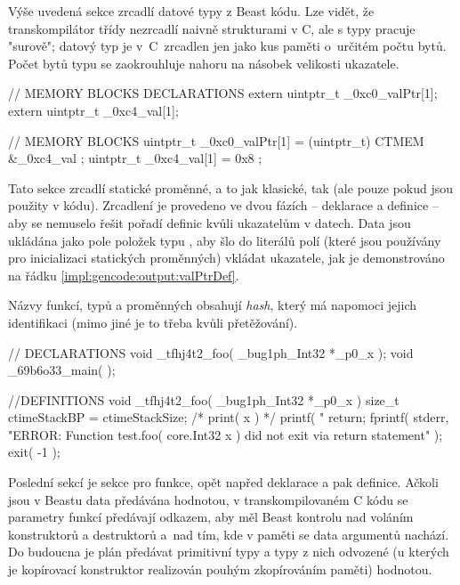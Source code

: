 Výše uvedená sekce zrcadlí datové typy z Beast kódu. Lze vidět, že transkompilátor třídy nezrcadlí naivně strukturami v C, ale s typy pracuje "surově"; datový typ je v~C~zrcadlen jen jako kus paměti o~určitém počtu bytů. Počet bytů typu se zaokrouhluje nahoru na násobek velikosti ukazatele.

\begin{cppcode}
// MEMORY BLOCKS DECLARATIONS
extern uintptr_t _0xc0_valPtr[1];
extern uintptr_t _0xc4_val[1];

// MEMORY BLOCKS
uintptr_t _0xc0_valPtr[1] = { (uintptr_t) CTMEM &_0xc4_val };$\label{impl:gencode:output:valPtrDef}$
uintptr_t _0xc4_val[1] = { 0x8 };
\end{cppcode}

Tato sekce zrcadlí statické proměnné, a to jak klasické, tak \ctime (ale pouze pokud jsou použity v kódu). Zrcadlení je provedeno ve dvou fázích -- deklarace a definice -- aby se nemuselo řešit pořadí definic kvůli ukazatelům v datech. Data jsou ukládána jako pole položek typu , aby šlo do literálů polí (které jsou používány pro inicializaci statických proměnných) vkládat ukazatele, jak je demonstrováno na řádku \ref{impl:gencode:output:valPtrDef}.

Názvy funkcí, typů a proměnných obsahují \textit{hash}, který má napomoci jejich identifikaci (mimo jiné je to třeba kvůli přetěžování).

\begin{cppcode}
// DECLARATIONS
void _tfhj4t2_foo( _bug1ph_Int32 *_p0_x );
void _69b6o33_main( );

//DEFINITIONS
void _tfhj4t2_foo( _bug1ph_Int32 *_p0_x ) {
	size_t ctimeStackBP = ctimeStackSize;
	{
		/* print( x ) */
		{
			printf( "%
		}
	}
	return;
	fprintf( stderr, "ERROR: Function test.foo( core.Int32 x ) did not exit via return statement\n" );
	exit( -1 );
}
\end{cppcode}

Poslední sekcí je sekce pro funkce, opět napřed deklarace a pak definice. Ačkoli jsou v Beastu data předávána hodnotou, v transkompilovaném C kódu se parametry funkcí předávají odkazem, aby měl Beast kontrolu nad voláním konstruktorů a destruktorů a~nad tím, kde v paměti se data argumentů nachází. Do budoucna je plán předávat primitivní typy a typy z nich odvozené (u kterých je kopírovací konstruktor realizován pouhým zkopírováním paměti) hodnotou.

